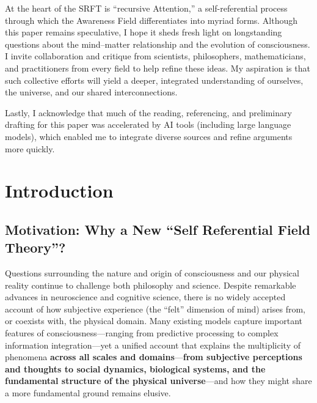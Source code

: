 \documentclass[12pt,a4paper]{article}
\begin{document}
At the heart of the SRFT is “recursive Attention,” a self-referential process through which the Awareness Field differentiates into myriad forms. Although this paper remains speculative, I hope it sheds fresh light on longstanding questions about the mind–matter relationship and the evolution of consciousness. I invite collaboration and critique from scientists, philosophers, mathematicians, and practitioners from every field to help refine these ideas. My aspiration is that such collective efforts will yield a deeper, integrated understanding of ourselves, the universe, and our shared interconnections.

Lastly, I acknowledge that much of the reading, referencing, and preliminary drafting for this paper was accelerated by AI tools (including large language models), which enabled me to integrate diverse sources and refine arguments more quickly.

\newpage
\tableofcontents
\newpage

\section{Introduction}
\label{sec:intro}

\subsection{Motivation: Why a New ``Self Referential Field Theory''?}
Questions surrounding the nature and origin of consciousness and our physical reality continue to challenge both philosophy and science. Despite remarkable advances in neuroscience and cognitive science, there is no widely accepted account of how subjective experience (the ``felt'' dimension of mind) arises from, or coexists with, the physical domain. Many existing models capture important features of consciousness—ranging from predictive processing to complex information integration—yet a unified account that explains the multiplicity of phenomena \textbf{across all scales and domains}—\textbf{from subjective perceptions and thoughts to social dynamics, biological systems, and the fundamental structure of the physical universe}—and how they might share a more fundamental ground remains elusive.
\end{document}
